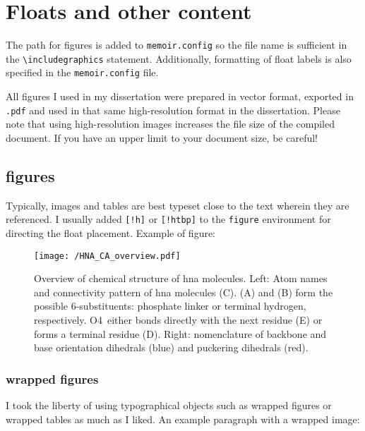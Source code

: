 \chapter{Floats and other content}\label{aims:chap}

The path for figures is added to \verb=memoir.config= so the file name is sufficient in the \verb=\includegraphics= statement. Additionally, formatting of float labels is also specified in the \verb=memoir.config= file.

All figures I used in my dissertation were prepared in vector format, exported in \verb=.pdf= and used in that same high-resolution format in the dissertation. Please note that using high-resolution images increases the file size of the compiled document. If you have an upper limit to your document size, be careful!

\section{figures}

Typically, images and tables are best typeset close to the text wherein they are referenced. I usually added \verb=[!h]= or \verb=[!htbp]= to the \verb=figure= environment for directing the float placement. Example of figure:

\begin{figure}[!h]
\centering
\texttt{[image: /HNA\_CA\_overview.pdf]}
\caption{Overview of chemical structure of \gls{hna} molecules. Left: Atom names and connectivity pattern of \gls{hna} molecules (C). (A) and (B) form the possible 6\pr-substituents: phosphate linker or terminal hydrogen, respectively. O4\pr\ either bonds directly with the next residue (E) or forms a terminal residue (D). Right: nomenclature of backbone and base orientation dihedrals (blue) and puckering dihedrals (red).}
\label{fig:HNAoverview}
\end{figure}

\subsection{wrapped figures}

I took the liberty of using typographical objects such as wrapped figures or wrapped tables as much as I liked. An example paragraph with a wrapped image:

